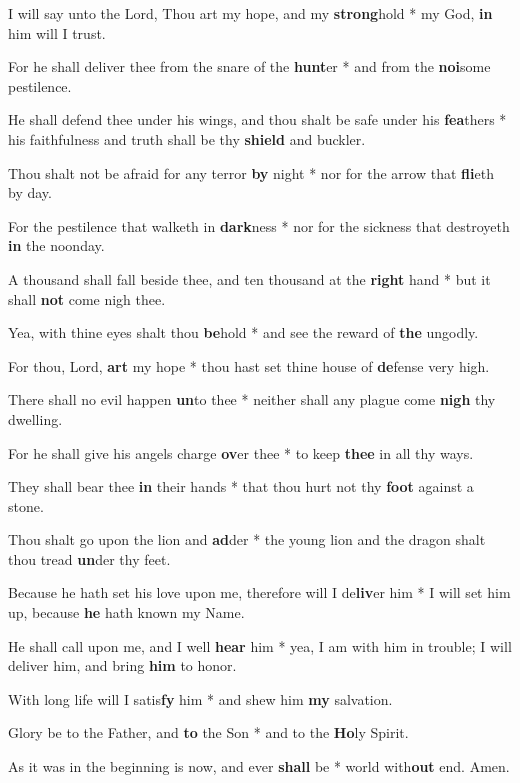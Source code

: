 \begin{multicols}{2}
	I will say unto the Lord, Thou art my hope, and my \textbf{strong}hold * my God, \textbf{in} him will I trust.
	
	For he shall deliver thee from the snare of the \textbf{hunt}er * and from the \textbf{noi}some pestilence.
	
	He shall defend thee under his wings, and thou shalt be safe under his \textbf{fea}thers * his faithfulness and truth shall be thy \textbf{shield} and buckler.
	
	Thou shalt not be afraid for any terror \textbf{by} night * nor for the arrow that \textbf{fli}eth by day.
	
	For the pestilence that walketh in \textbf{dark}ness * nor for the sickness that destroyeth \textbf{in} the noonday.
	
	A thousand shall fall beside thee, and ten thousand at the \textbf{right} hand * but it shall \textbf{not} come nigh thee.
	
	Yea, with thine eyes shalt thou \textbf{be}hold * and see the reward of \textbf{the} ungodly.
	
	For thou, Lord, \textbf{art} my hope * thou hast set thine house of \textbf{de}fense very high.
	
	There shall no evil happen \textbf{un}to thee * neither shall any plague come \textbf{nigh} thy dwelling.
	
	For he shall give his angels charge \textbf{ov}er thee * to keep \textbf{thee} in all thy ways.
	
	They shall bear thee \textbf{in} their hands * that thou hurt not thy \textbf{foot} against a stone.
	
	Thou shalt go upon the lion and \textbf{ad}der * the young lion and the dragon shalt thou tread \textbf{un}der thy feet.
	
	Because he hath set his love upon me, therefore will I de\textbf{liv}er him * I will set him up, because \textbf{he} hath known my Name.
	
	He shall call upon me, and I well \textbf{hear} him * yea, I am with him in trouble; I will deliver him, and bring \textbf{him} to honor.
	
	With long life will I satis\textbf{fy} him * and shew him \textbf{my} salvation.
	
	Glory be to the Father, and \textbf{to} the Son * and to the \textbf{Ho}ly Spirit.
	
	As it was in the beginning is now, and ever \textbf{shall} be * world with\textbf{out} end. Amen.
\end{multicols}